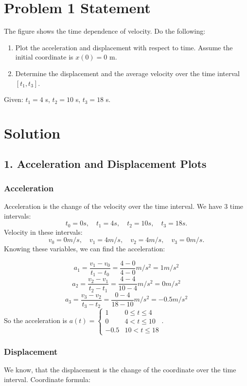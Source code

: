 \documentclass{article}
\begin{document}


\section*{Problem 1 Statement}
The figure shows the time dependence of velocity. Do the following:

\begin{enumerate}
    \item Plot the acceleration and displacement with respect to time. Assume the initial coordinate is $x(0) = 0$ m.
    \item Determine the displacement and the average velocity over the time interval $[t_1, t_3]$.
\end{enumerate}

Given: $t_1 = 4$ s, $t_2 = 10$ s, $t_3 = 18$ s.

\section*{Solution}

\subsection*{1. Acceleration and Displacement Plots}

\subsubsection*{Acceleration}
Acceleration is the change of the velocity over the time interval.
We have 3 time intervals: 
\[
t_0 = 0s, \quad t_1 = 4s, \quad t_2 = 10s, \quad t_3 = 18s.
\]
Velocity in these intervals:
\[
v_0 = 0 m/s, \quad v_1 = 4m/s, \quad v_2 = 4m/s, \quad v_3 = 0m/s.
\]
Knowing these variables, we can find the acceleration:

$$ a_1 = \frac{v_1 - v_0}{t_1 - t_0} = \frac{4 - 0}{4 - 0}m/s^2 = 1m/s^2  $$
$$ a_2 = \frac{v_2 - v_1}{t_2 - t_1} = \frac{4 - 4}{10 - 4}m/s^2  = 0m/s^2  $$ 
$$ a_3 = \frac{v_3 - v_2}{t_3 - t_2} = \frac{0 - 4}{18 - 10}m/s^2  = -0.5m/s^2  $$
So the acceleration is $a(t) = \begin{cases} 1 & 0 \leq t \leq 4 \\ 0 & 4 < t \leq 10 \\ -0.5 & 10 < t \leq 18 \end{cases}$.

\subsubsection*{Displacement}
We know, that the displacement is the change of the coordinate over the time interval. Coordinate formula:
\end{document}
